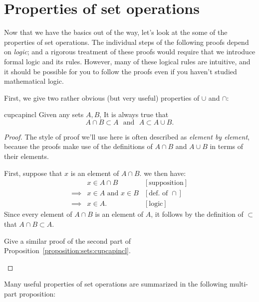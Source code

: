 \section{Properties of set operations}

Now that we have the basics out of the way, let's look at the some of  the properties of set operations.
The individual steps of the following proofs depend on \emph{logic}; and a rigorous treatment  of these proofs would require that we introduce formal logic and its rules. However, many of these logical rules are intuitive, and it should be possible for you to follow the proofs even if you haven't studied mathematical logic.

 First, we give two rather obvious (but very useful) properties of $\cup$ and $\cap$:

\begin{prop}{cupcapincl}
Given any sets $A,B$, It is always true that
\[
A \cap B \subset A \mathrm{~~~and~~~}A \subset A \cup B.
\]
\end{prop}
\begin{proof}
The style of proof we'll use here  is often described as \emph{element by element}, because the proofs make use of the definitions of $A\cap B$ and $A\cup B$ in terms of their elements. 

First, suppose that $x$ is an element of $A \cap B$. we then have:
\begin{align*}
&x \in A \cap B &[\text{supposition}]\\
\implies &x \in A \text{ and } x\in B &[\text{def. of }\cap]\\
\implies &x \in A.&[\text{logic}]
\end{align*}
Since every element of $A \cap B$ is an element of $A$, it follows by the definition of $\subset$ that $A \cap B \subset A$.

\begin{exercise}{23}
Give a similar proof of the second part of Proposition~\ref{proposition:sets:cupcapincl}.
\end{exercise}
\end{proof}

Many useful properties of set operations are summarized in the following multi-part proposition: 

